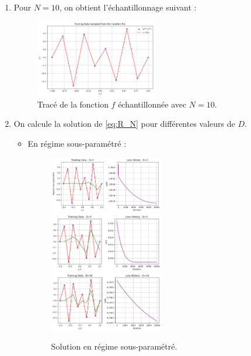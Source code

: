 \documentclass[12pt,a4paper]{article}
\begin{document}
\begin{enumerate}
    \item Pour $N = 10$, on obtient l'échantillonnage suivant :
    
    \begin{figure}[ht]
        \centering
        \includegraphics[width=0.5\textwidth]{src/trace_f_echantillonne.png}
        \caption{Tracé de la fonction $f$ échantillonnée avec $N = 10$.}
        \label{fig:trace_f_echantillonne10}
    \end{figure}
    


    \item On calcule la solution de \ref{eq:R_N} pour différentes valeurs de $D$.
    \begin{itemize}
        \item En régime sous-paramétré :
        \begin{figure}[ht]
            \centering
            \includegraphics[width=0.5\textwidth]{src/P1.png}
            \includegraphics[width=0.5\textwidth]{src/P2.png}
            \includegraphics[width=0.5\textwidth]{src/P3.png}
            \caption{Solution en régime sous-paramétré.}
            \label{fig:regime_sous_parametre}
        \end{figure}


\end{itemize}
\end{enumerate}
\end{document}

